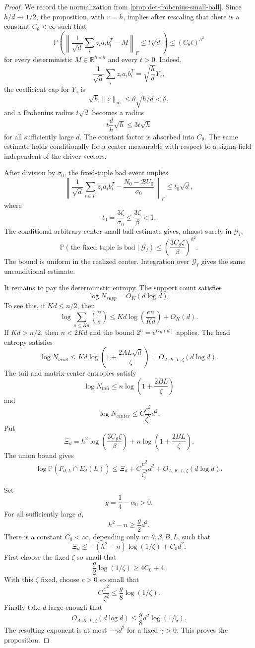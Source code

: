 \documentclass[11pt]{article}
\numberwithin{equation}{section}
\theoremstyle{definition}
\theoremstyle{remark}
\newcommand{\R}{\mathbb R}
\newcommand{\Pp}{\mathbb P}
\newcommand{\1}{\boldsymbol 1}
\newcommand{\cB}{\mathcal B}
\begin{document}
\begin{aiblock}
\begin{proof}
  We record the normalization from
  \cref{prop:det-frobenius-small-ball}. Since $h/d\to1/2$,
  the proposition, with $r=h$, implies after rescaling
  that there is a constant $C_\theta<\infty$ such that
  \[
    \Pp\left( \left\|\frac1{\sqrt d}\sum_i
    z_ia_ib_i^T-M\right\|_F \le t\sqrt d \right)
    \le(C_\theta t)^{h^2}
  \]
  for every deterministic $M\in\R^{h\times h}$ and every
  $t>0$. Indeed,
  \[
    \frac1{\sqrt d}\sum_i z_ia_ib_i^T
    =\sqrt{\frac hd}Y_z,
  \]
  the coefficient cap for $Y_z$ is
  \[
    \sqrt h\|z\|_\infty\le\theta\sqrt{h/d}<\theta,
  \]
  and a Frobenius radius $t\sqrt d$ becomes a radius
  \[
    t\frac d h\sqrt h\le3t\sqrt h
  \]
  for all sufficiently large $d$. The constant factor is
  absorbed into $C_\theta$. The same estimate holds
  conditionally for a center measurable with respect to a
  sigma-field independent of the driver vectors.

  After division by $\sigma_0$, the fixed-tuple bad event
  implies
  \[
    \left\| \frac1{\sqrt d}\sum_{i\in I^c}z_ia_ib_i^T
    -\frac{N_0-\cB U_0}{\sigma_0} \right\|_F \le
    t_0\sqrt d,
  \]
  where
  \[
    t_0=\frac{3\zeta}{\sigma_0}
    \le\frac{3\zeta}{\beta}<1.
  \]
  The conditional arbitrary-center small-ball estimate
  gives, almost surely in $\mathcal G_I$,
  \[
    \Pp(\text{the fixed tuple is bad}\mid\mathcal G_I)
    \le \left(\frac{3C_\theta\zeta}{\beta}\right)^{h^2}.
  \]
  The bound is uniform in the realized center.
  Integration over $\mathcal G_I$ gives the same
  unconditional estimate.

  It remains to pay the deterministic entropy. The
  support count satisfies
  \[
    \log N_{supp}=O_K(d\log d).
  \]
  To see this, if $Kd\le n/2$, then
  \[
    \log\sum_{s\le Kd}\binom ns \le
    Kd\log\left(\frac{en}{Kd}\right)+O_K(d).
  \]
  If $Kd>n/2$, then $n<2Kd$ and the bound
  $2^n=e^{O_K(d)}$ applies. The head entropy satisfies
  \[
    \log N_{head} \le
    Kd\log\left(1+\frac{2AL\sqrt d}{\zeta}\right)
    =O_{A,K,L,\zeta}(d\log d).
  \]
  The tail and matrix-center entropies satisfy
  \[
    \log N_{tail} \le
    n\log\left(1+\frac{2BL}{\zeta}\right)
  \]
  and
  \[
    \log N_{center} \le C\frac{c^2}{\zeta^2}d^2.
  \]
  Put
  \[
    \Xi_d=h^2\log\left(\frac{3C_\theta\zeta}{\beta}\right)
    +n\log\left(1+\frac{2BL}{\zeta}\right).
  \]
  The union bound gives
  \[
    \log\Pp(F_{d,L}\cap E_d(L)) \le\Xi_d
    +C\frac{c^2}{\zeta^2}d^2
    +O_{A,K,L,\zeta}(d\log d).
  \]

  Set
  \[
    g=\frac14-\alpha_0>0.
  \]
  For all sufficiently large $d$,
  \[
    h^2-n\ge\frac g2d^2.
  \]
  There is a constant $C_0<\infty$, depending only on
  $\theta,\beta,B,L$, such that
  \[
    \Xi_d\le-(h^2-n)\log(1/\zeta)+C_0d^2.
  \]
  First choose the fixed $\zeta$ so small that
  \[
    \frac g2\log(1/\zeta)\ge4C_0+4.
  \]
  With this $\zeta$ fixed, choose $c>0$ so small that
  \[
    C\frac{c^2}{\zeta^2} \le \frac g8\log(1/\zeta).
  \]
  Finally take $d$ large enough that
  \[
    O_{A,K,L,\zeta}(d\log d) \le
    \frac g8d^2\log(1/\zeta).
  \]
  The resulting exponent is at most $-\gamma d^2$ for a
  fixed $\gamma>0$. This proves the proposition.
\end{proof}    
\end{aiblock}
\end{document}
